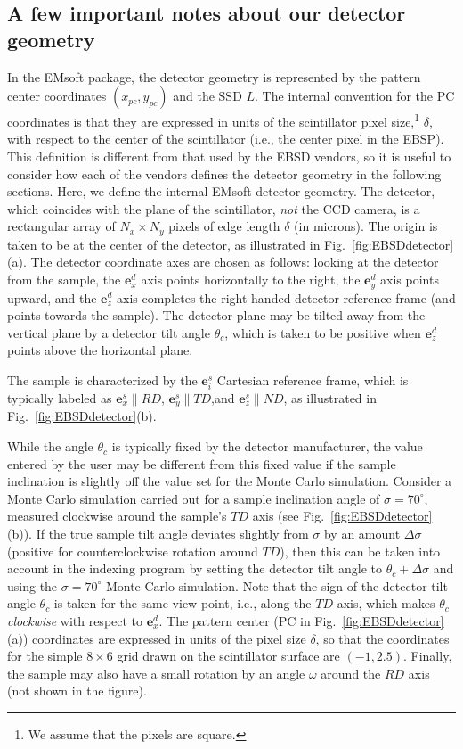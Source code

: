 \documentclass[DIV=calc, paper=letter, fontsize=11pt]{scrartcl}	 %
\begin{document}
\subsection{A few important notes about our detector geometry\label{sec:detectorgeometry}}
In the \textsf{EMsoft} package, the detector geometry is represented by the pattern center coordinates $(x_{pc},y_{pc})$ and the SSD $L$.
The internal convention for the PC coordinates is that they are expressed in units of the scintillator pixel size,\footnote{We assume that the pixels are square.} $\delta$, with respect to the center
of the scintillator (i.e., the center pixel in the EBSP).  This definition is different from that used by the EBSD vendors, so it is useful to consider 
how each of the vendors defines the detector geometry in the following sections.  Here, we define the internal \textsf{EMsoft} detector geometry.
The detector, which coincides with the plane of the scintillator, \textit{not} the CCD camera, is a rectangular array of $N_x\times N_y$ pixels of edge length $\delta$ (in microns). The origin is taken to be at the center of 
the detector, as illustrated in Fig.~\ref{fig:EBSDdetector}(a).  The detector coordinate axes are chosen as follows: looking at the detector from the sample, the $\mathbf{e}^d_x$ axis points horizontally 
to the right, the $\mathbf{e}^d_y$ axis points upward, and the $\mathbf{e}^d_z$ axis completes the right-handed detector reference frame (and points towards the 
sample).  The detector plane may be tilted away from the vertical plane by a detector tilt angle $\theta_c$, which is taken to be positive when $\mathbf{e}^d_z$ points above the horizontal
plane.  

The sample is characterized by the $\mathbf{e}^s_i$ Cartesian reference frame, which is typically labeled as $\mathbf{e}^s_x\parallel RD$, $\mathbf{e}^s_y\parallel TD$,and
$\mathbf{e}^s_z\parallel ND$, as illustrated in Fig.~\ref{fig:EBSDdetector}(b).  

While the angle $\theta_c$ is typically fixed by the detector manufacturer, the value entered by the user may be different from this fixed value if the sample inclination
is slightly off the value set for the Monte Carlo simulation.  Consider a Monte Carlo simulation carried out for a sample inclination angle of $\sigma=70^{\circ}$, measured clockwise
around the sample's $TD$ axis (see Fig.~\ref{fig:EBSDdetector}(b)).  If the true sample tilt angle deviates slightly from $\sigma$ by an amount $\Delta\sigma$ (positive for counterclockwise rotation around $TD$), then this can
be taken into account in the indexing program by setting the detector tilt angle to $\theta_c+\Delta\sigma$ and using the $\sigma=70^{\circ}$ Monte Carlo simulation.  
Note that the sign of the detector tilt angle $\theta_c$ is taken for the same view point, i.e., along the $TD$ axis, which makes $\theta_c$ \textit{clockwise} with 
respect to $\mathbf{e}^d_x$. The pattern center (PC in Fig.~\ref{fig:EBSDdetector}(a)) coordinates are expressed in units of the pixel size $\delta$, so that the coordinates for the 
simple $8\times 6$ grid drawn on the scintillator surface are $(-1,2.5)$.  Finally, the sample may also have a small rotation by an angle $\omega$ around the $RD$ axis (not shown in the figure).
\end{document}
